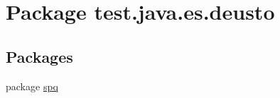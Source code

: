 \hypertarget{namespacetest_1_1java_1_1es_1_1deusto}{}\section{Package test.\+java.\+es.\+deusto}
\label{namespacetest_1_1java_1_1es_1_1deusto}
\subsection*{Packages}
\begin{DoxyCompactItemize}
\item 
package \hyperlink{namespacetest_1_1java_1_1es_1_1deusto_1_1spq}{spq}
\end{DoxyCompactItemize}
